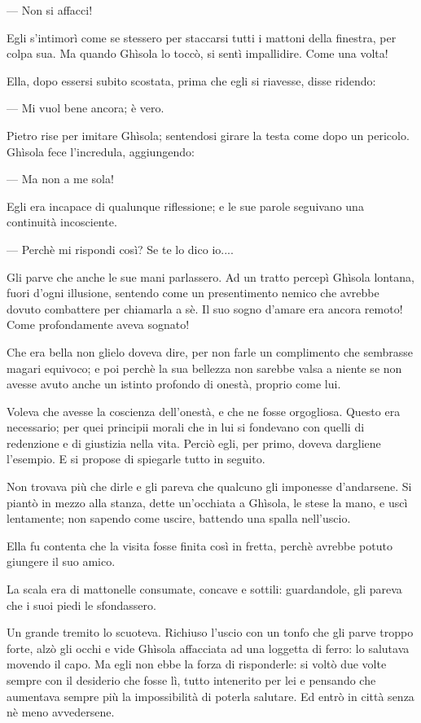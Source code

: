 — Non si affacci!

Egli s’intimorì come se stessero per staccarsi tutti i mattoni della finestra, per colpa sua. Ma quando Ghìsola lo toccò, si sentì impallidire. Come una volta!

Ella, dopo essersi subito scostata, prima che egli si riavesse, disse ridendo:

— Mi vuol bene ancora; è vero.

Pietro rise per imitare Ghìsola; sentendosi girare la testa come dopo un pericolo. Ghìsola fece l'incredula, aggiungendo:

— Ma non a me sola!

Egli era incapace di qualunque riflessione; e le sue parole seguivano una continuità incosciente.

— Perchè mi rispondi così? Se te lo dico io....

Gli parve che anche le sue mani parlassero. Ad un tratto percepì Ghìsola lontana, fuori d’ogni illusione, sentendo come un presentimento nemico che avrebbe dovuto combattere per chiamarla a sè. Il suo sogno d’amare era ancora remoto! Come profondamente aveva sognato!

Che era bella non glielo doveva dire, per non farle un complimento che sembrasse magari equivoco; e poi perchè la sua bellezza non sarebbe valsa a niente se non avesse avuto anche un istinto profondo di onestà, proprio come lui.

Voleva che avesse la coscienza dell’onestà, e che ne fosse orgogliosa. Questo era necessario; per quei principii morali che in lui si fondevano con quelli di redenzione e di giustizia nella vita. Perciò egli, per primo, doveva dargliene l’esempio. E si propose di spiegarle tutto in seguito.

Non trovava più che dirle e gli pareva che qualcuno gli imponesse d’andarsene. Si piantò in mezzo alla stanza, dette un’occhiata a Ghìsola, le stese la mano, e uscì lentamente; non sapendo come uscire, battendo una spalla nell’uscio.

Ella fu contenta che la visita fosse finita così in fretta, perchè avrebbe potuto giungere il suo amico.

La scala era di mattonelle consumate, concave e sottili: guardandole, gli pareva che i suoi piedi le sfondassero.

Un grande tremito lo scuoteva. Richiuso l’uscio con un tonfo che gli parve troppo forte, alzò gli occhi e vide Ghìsola affacciata ad una loggetta di ferro: lo salutava movendo il capo. Ma egli non ebbe la forza di risponderle: si voltò due volte sempre con il desiderio che fosse lì, tutto intenerito per lei e pensando che aumentava sempre più la impossibilità di poterla salutare. Ed entrò in città senza nè meno avvedersene.

